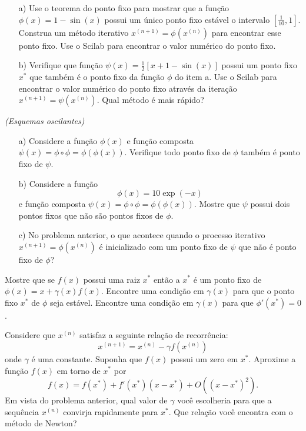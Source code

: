 \begin{Exercise}[title=Taxa de convergência]
\begin{itemize}
\item[a)] Use o teorema do ponto fixo para mostrar que a função $\phi(x)=1-\sin(x)$ possui um único ponto fixo estável o intervalo $[\frac{1}{10},1]$. Construa um método iterativo $x^{(n+1)}=\phi(x^{(n)})$ para encontrar esse ponto fixo. Use o Scilab para encontrar o valor numérico do ponto fixo.
\item[b)] Verifique que função $\psi(x)=\frac{1}{2}\left[x+1-\sin(x)\right]$ possui um ponto fixo $x^*$ que também é o ponto fixo da função $\phi$ do item a. Use o Scilab para encontrar o valor numérico do ponto fixo através da iteração $x^{(n+1)}=\psi(x^{(n)})$. Qual método é mais rápido?
\end{itemize}
\end{Exercise}


\begin{Exercise}\it {(Esquemas oscilantes)}
\begin{itemize}
\item[a)] Considere a função $\phi(x)$ e função composta $\psi(x)=\phi\circ \phi=\phi\left(\phi(x)\right)$. Verifique todo ponto fixo de $\phi$ também é ponto fixo de $\psi$.

\item[b)]  Considere a função $$\phi(x)=10\exp(-x)$$ e função composta $\psi(x)=\phi\circ \phi=\phi\left(\phi(x)\right)$. Mostre que $\psi$ possui dois pontos fixos que não são pontos fixos de $\phi$.

\item[c)]  No problema anterior, o que acontece quando o processo iterativo $x^{(n+1)}=\phi(x^{(n)})$ é inicializado com um ponto fixo de $\psi$ que não é ponto fixo de $\phi$?
\end{itemize}
\end{Exercise}

\begin{Exercise}[title= Aceleração de convergência - introdução ao método de Newton]\label{int_new1} Mostre que se $f(x)$ possui uma raiz $x^*$ então a $x^*$ é um ponto fixo de $\phi(x)=x+\gamma(x) f(x)$. Encontre uma condição em $\gamma(x)$ para que o ponto fixo $x^*$ de $\phi$ seja estável. Encontre uma condição em $\gamma(x)$ para que $\phi'(x^*)=0$.
\end{Exercise}

\begin{Exercise}[title=Aceleração de convergência - introdução ao método de Newton]\label{int_new2} Considere que $x^{(n)}$ satisfaz a seguinte relação de recorrência:
$$x^{(n+1)}=x^{(n)} - \gamma f(x^{(n)})$$
onde $\gamma$ é uma constante. Suponha que $f(x)$ possui um zero em $x^*$. Aproxime a função $f(x)$ em torno de $x^*$ por
$$f(x)=f(x^*)+f'(x^*)(x-x^*)+O\left((x-x^*)^2\right).$$
Em vista do problema anterior, qual valor de $\gamma$ você escolheria para que a sequência $x^{(n)}$ convirja rapidamente para $x^*$. Que relação você encontra com o método de Newton?
\end{Exercise}

